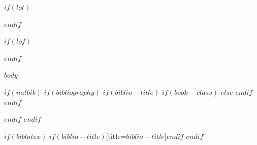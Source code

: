 \documentclass[10pt, a4paper, titlepage, twoside, openright, final]{memoir}
\begin{document}
$if(lot)$
    \listoftables
$endif$

$if(lof)$
    \listoffigures
$endif$


\mainmatter
$body$

\appendix

\backmatter

$if(natbib)$
    $if(bibliography)$
        $if(biblio-title)$
            $if(book-class)$
                \renewcommand\bibname{$biblio-title$}
            $else$
                \renewcommand\refname{$biblio-title$}
            $endif$
        $endif$
        
    $endif$
$endif$

$if(biblatex)$
    \printbibliography$if(biblio-title)$[title=$biblio-title$]$endif$
$endif$


\end{document}
